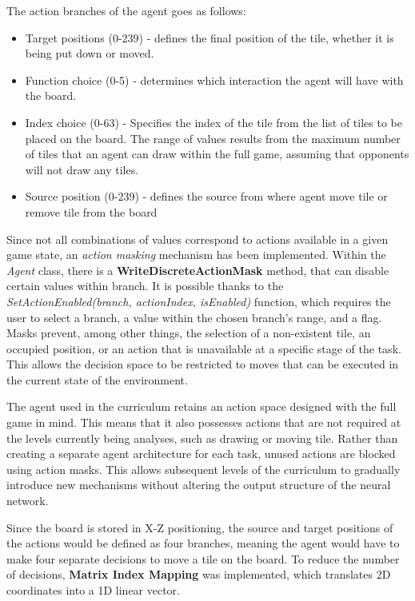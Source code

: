 The action branches of the agent goes as follows:
\begin{itemize}
	\item Target positions (0-239) - defines the final position of the tile, whether it is being put down or moved.  
	\item Function choice (0-5) - determines which interaction the agent will have with the board.
	\item Index choice (0-63) - Specifies the index of the tile from the list of tiles to be placed on the board. The range of values results from the maximum number of tiles that an agent can draw within the full game, assuming that opponents will not draw any tiles.
	\item Source position (0-239) - defines the source from where agent move tile or remove tile from the board
\end{itemize}

Since not all combinations of values correspond to actions available in a given game state, an \textit{action masking} mechanism has been implemented. Within the \textit{Agent} class, there is a \textbf{WriteDiscreteActionMask} method, that can disable certain values within branch. It is possible thanks to the \textit{SetActionEnabled(branch, actionIndex, isEnabled)} function, which requires the user to select a branch, a value within the chosen branch's range, and a flag. Masks prevent, among other things, the selection of a non-existent tile, an occupied position, or an action that is unavailable at a specific stage of the task. This allows the decision space to be restricted to moves that can be executed in the current state of the environment.

The agent used in the curriculum retains an action space designed with the full game in mind. This means that it also possesses actions that are not required at the levels currently being analyses, such as drawing or moving tile. Rather than creating a separate agent architecture for each task, unused actions are blocked using action masks. This allows subsequent levels of the curriculum to gradually introduce new mechanisms without altering the output structure of the neural network.

Since the board is stored in X-Z positioning, the source and target positions of the actions would be defined as four branches, meaning the agent would have to make four separate decisions to move a tile on the board. 
To reduce the number of decisions, \textbf{Matrix Index Mapping} was implemented, which translates 2D coordinates into a 1D linear vector. 

